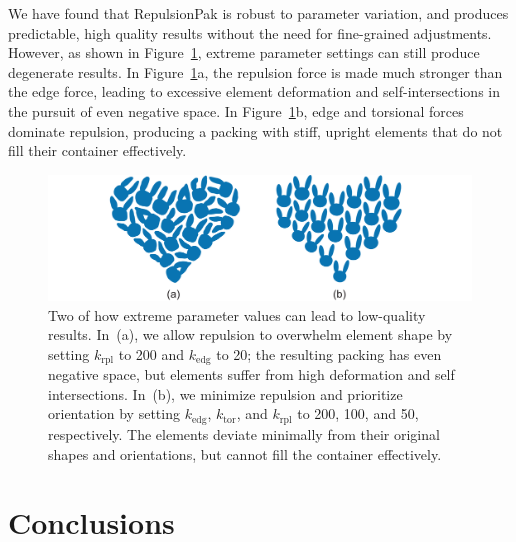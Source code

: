 We have found that RepulsionPak is robust to parameter variation, and 
produces predictable, high quality results without the need for fine-grained
adjustments.  However, as shown in Figure~\ref{bad_results}, extreme parameter 
settings can still produce degenerate results.
In Figure~\ref{bad_results}a, the repulsion force is made much stronger than 
the edge force, leading to excessive element deformation and
self-intersections in the pursuit of even negative space.  In 
Figure~\ref{bad_results}b, edge and torsional forces dominate repulsion,
producing a packing with stiff, upright elements that do not fill their
container effectively.


\makeatletter %
\setlength{\@fptop}{0pt} %
\makeatother %
\begin{figure}
\centering
\includegraphics[width=1.0\textwidth]{figures/repulsionpak/bad_results.pdf} 
\vspace{-12pt}
\caption[Two examples of how extreme parameter values can lead to \newline 
	low-quality results]
	{\label{bad_results}
Two  of how extreme parameter values can lead to
	low-quality results.  In~(a), we allow repulsion to overwhelm element
	shape by setting $k_\mathrm{rpl}$ to 200 and $k_\mathrm{edg}$ to 20; the resulting packing 
	has even negative space, but elements suffer from high deformation
	and self intersections.  In~(b), we minimize repulsion and prioritize
	orientation by setting $k_\mathrm{edg}$, $k_\mathrm{tor}$, and $k_\mathrm{rpl}$ to 200, 100, and 50,
	respectively.  The elements deviate minimally from their original shapes 
	and orientations, but cannot fill the container effectively.
}
\end{figure}



\section{Conclusions}
\label{repulsionpak_conclusions}

